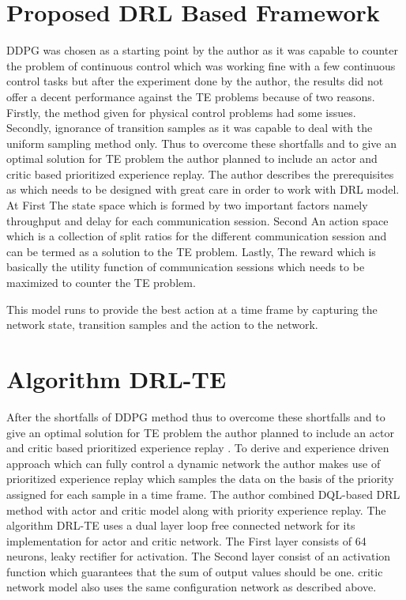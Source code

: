 \section{Proposed DRL Based Framework}
\label{sec:Proposed_DRL}

DDPG \cite{Exp:_DRLapproach} was chosen as a starting point by the author as it was capable to counter the problem of continuous control which was working fine with a few continuous control tasks but after the experiment done by the author, the results did not offer a decent  performance against the TE problems because of two reasons. Firstly, the method given for physical control problems had some issues. Secondly, ignorance of transition samples as it was capable to deal with the uniform sampling method only. Thus to overcome these shortfalls and to give an optimal solution for TE problem the author planned to include an actor and critic based prioritized experience replay. The author describes the prerequisites as \cite{Exp:_DRLapproach}  which needs to be designed with great care in order to work with DRL model. At First The state space which is formed by two important factors namely throughput and delay for each
communication session. Second An action space which is a collection of split ratios for the different communication session and can be termed as a solution to the TE problem. Lastly, The reward which is basically the utility function of communication sessions which needs to be maximized to counter the TE problem.

This model runs to provide the best action at a time frame by capturing the network state, transition samples and the action to the network.

\section{Algorithm DRL-TE}
\label{sec:relwork}

After the shortfalls of DDPG \cite{pmlr-v32-silver14} method thus to overcome these shortfalls and to give an optimal solution for TE problem the author planned to include an actor and critic based prioritized experience replay  \cite{Exp:_DRLapproach}. 
To derive and experience driven approach which can fully control a dynamic network the author makes use of prioritized experience replay which samples the data on the basis of the priority assigned for each sample in a time frame. The author combined DQL-based DRL method with actor and critic model along with priority experience replay. The algorithm DRL-TE \cite{Exp:_DRLapproach} uses a dual layer loop free connected network for its implementation for actor and critic network.
The First layer consists of 64 neurons, leaky rectifier for activation.
The Second layer consist of an activation function which guarantees that the sum of output values should be one. critic network model also uses the same configuration network as described above.

